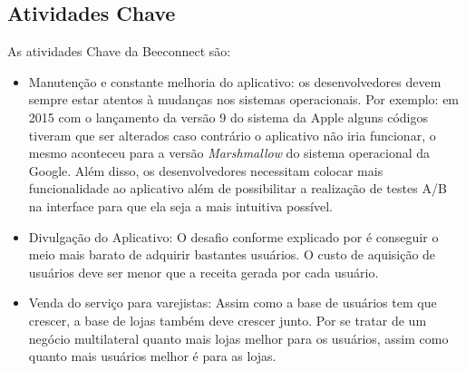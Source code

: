 \subsection{Atividades Chave}
\label{cha:parcerias_chave}
As atividades Chave da Beeconnect são:
\begin{itemize}
\item Manutenção e constante melhoria do aplicativo: os desenvolvedores devem sempre estar atentos à mudanças nos sistemas operacionais. Por exemplo: em 2015 com o lançamento da versão 9 do sistema da Apple alguns códigos tiveram que ser alterados caso contrário o aplicativo não iria funcionar, o mesmo aconteceu para a versão \textit{Marshmallow} do sistema operacional da Google. Além disso, os desenvolvedores necessitam colocar mais funcionalidade ao aplicativo além de possibilitar a realização de testes A/B na interface para que ela seja a mais intuitiva possível.
\item Divulgação do Aplicativo: O desafio conforme explicado por  é conseguir o meio mais barato de adquirir bastantes usuários. O custo de aquisição de usuários deve ser menor que a receita gerada por cada usuário.
\item Venda do serviço para varejistas: Assim como a base de usuários tem que crescer, a base de lojas também deve crescer junto. Por se tratar de um negócio multilateral quanto mais lojas melhor para os usuários, assim como quanto mais usuários melhor é para as lojas.
\end{itemize}

